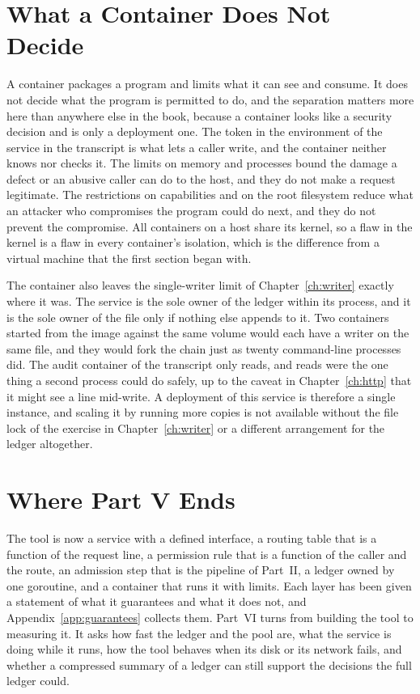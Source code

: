 \section{What a Container Does Not Decide}

A container packages a program and limits what it can see and consume. It does not decide what the program is permitted to do, and the separation matters more here than anywhere else in the book, because a container looks like a security decision and is only a deployment one. The token in the environment of the service in the transcript is what lets a caller write, and the container neither knows nor checks it. The limits on memory and processes bound the damage a defect or an abusive caller can do to the host, and they do not make a request legitimate. The restrictions on capabilities and on the root filesystem reduce what an attacker who compromises the program could do next, and they do not prevent the compromise. All containers on a host share its kernel, so a flaw in the kernel is a flaw in every container's isolation, which is the difference from a virtual machine that the first section began with.

The container also leaves the single-writer limit of Chapter~\ref{ch:writer} exactly where it was. The service is the sole owner of the ledger within its process, and it is the sole owner of the file only if nothing else appends to it. Two containers started from the image against the same volume would each have a writer on the same file, and they would fork the chain just as twenty command-line processes did. The audit container of the transcript only reads, and reads were the one thing a second process could do safely, up to the caveat in Chapter~\ref{ch:http} that it might see a line mid-write. A deployment of this service is therefore a single instance, and scaling it by running more copies is not available without the file lock of the exercise in Chapter~\ref{ch:writer} or a different arrangement for the ledger altogether.

\section{Where Part V Ends}

The tool is now a service with a defined interface, a routing table that is a function of the request line, a permission rule that is a function of the caller and the route, an admission step that is the pipeline of Part~II, a ledger owned by one goroutine, and a container that runs it with limits. Each layer has been given a statement of what it guarantees and what it does not, and Appendix~\ref{app:guarantees} collects them. Part~VI turns from building the tool to measuring it. It asks how fast the ledger and the pool are, what the service is doing while it runs, how the tool behaves when its disk or its network fails, and whether a compressed summary of a ledger can still support the decisions the full ledger could.

